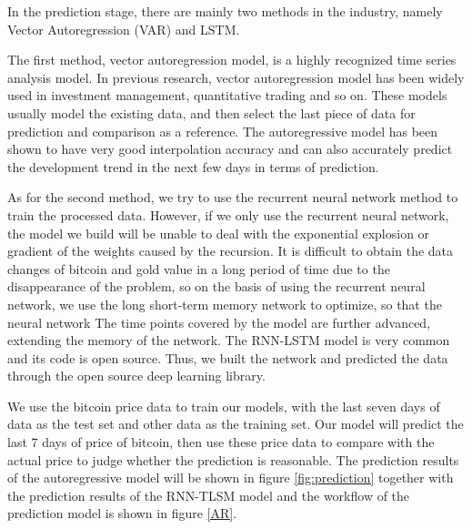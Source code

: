 \documentclass{mcmthesis}
\begin{document}
In the prediction stage, there are mainly two methods in the industry, namely Vector Autoregression (VAR) and LSTM.

The first method, vector autoregression model, is a highly recognized time series analysis model. In previous research, vector autoregression model has been widely used in investment management, quantitative trading and so on. These models usually model the existing data, and then select the last piece of data for prediction and comparison as a reference. The autoregressive model has been shown to have very good interpolation accuracy and can also accurately predict the development trend in the next few days in terms of prediction.

As for the second method, we try to use the recurrent neural network method to train the processed data. However, if we only use the recurrent neural network, the model we build will be unable to deal with the exponential explosion or gradient of the weights caused by the recursion. It is difficult to obtain the data changes of bitcoin and gold value in a long period of time due to the disappearance of the problem, so on the basis of using the recurrent neural network, we use the long short-term memory network to optimize, so that the neural network The time points covered by the model are further advanced, extending the memory of the network. The RNN-LSTM model is very common and its code is open source. Thus, we built the network and predicted the data through the open source deep learning library.

We use the bitcoin price data to train our models, with the last seven days of data as the test set and other data as the training set. Our model will predict the last 7 days of price of bitcoin, then use these price data to compare with the actual price to judge whether the prediction is reasonable.
The prediction results of the autoregressive model will be shown in figure \ref{fig:prediction} together with the prediction results of the RNN-TLSM model and the workflow of the prediction model is shown in figure \ref{AR}.
\end{document}
